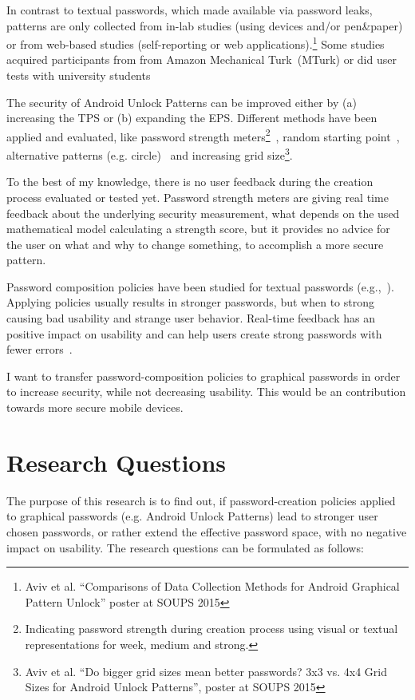 \documentclass[twocolumn, a4paper, 10pt]{article}
\begin{document}
In contrast to textual passwords, which made available via password leaks, patterns are only collected from in-lab studies (using devices and/or pen\&paper) or from web-based studies (self-reporting or web applications).\footnote{Aviv et al. ``Comparisons of Data Collection Methods for Android Graphical Pattern Unlock'' poster at SOUPS 2015} Some studies~\cite{siadati2015fortifying, Aviv:2014:UVP:2664243.2664253} acquired participants from from Amazon Mechanical Turk~(MTurk) or did user tests with university students~\cite{Uellenbeck:2013:QSG:2508859.2516700, Sun2014308}

The security of Android Unlock Patterns can be improved either by (a) increasing the TPS or (b) expanding the EPS. Different methods have been applied and evaluated, like password strength meters\footnote{Indicating password strength during creation process using visual or textual representations for week, medium and strong.}~\cite{Sun2014308, siadati2015fortifying}, random starting point~\cite{siadati2015fortifying}, alternative patterns (e.g. circle)~\cite{Uellenbeck:2013:QSG:2508859.2516700} and increasing grid size\footnote{Aviv et al. ``Do bigger grid sizes mean better passwords? 3x3 vs. 4x4 Grid Sizes for Android Unlock Patterns'', poster at SOUPS 2015}.

To the best of my knowledge, there is no user feedback during the creation process evaluated or tested yet. Password strength meters are giving real time feedback about the underlying security measurement, what depends on the used mathematical model calculating a strength score, but it provides no advice for the user on what and why to change something, to accomplish a more secure pattern.

Password composition policies have been studied for textual passwords (e.g.,~\cite{Inglesant:2010:TCU:1753326.1753384, Komanduri:2011:PPM:1978942.1979321}). Applying policies usually results in stronger passwords, but when to strong causing bad usability and strange user behavior. Real-time feedback has an positive impact on usability and can help users create strong passwords with fewer errors~\cite{Shay:2015:SSI:2702123.2702586}.

I want to transfer password-composition policies to graphical passwords in order to increase security, while not decreasing usability. This would be an contribution towards more secure mobile devices.


\section{Research Questions}
\label{sec:question}
The purpose of this research is to find out, if password-creation policies applied to graphical passwords (e.g. Android Unlock Patterns) lead to stronger user chosen passwords, or rather extend the effective password space, with no negative impact on usability. The research questions can be formulated as follows:
\end{document}
